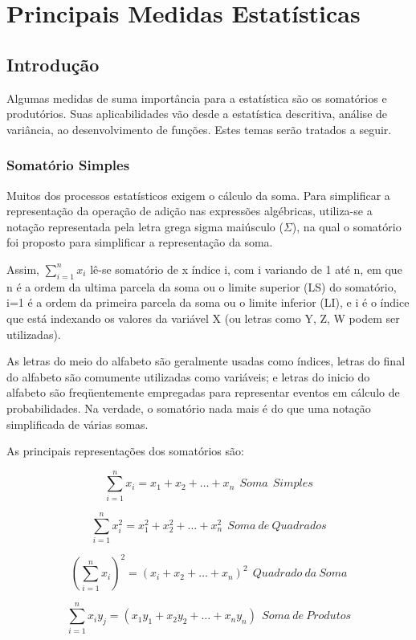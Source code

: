 \chapter{Principais Medidas Estatísticas}

\section{Introdução}

Algumas medidas de suma importância para a estatística são os somatórios e produtórios. Suas aplicabilidades vão desde a estatística descritiva, análise de variância, ao desenvolvimento de funções. Estes temas serão tratados a seguir.


\subsection{Somatório Simples}

\inic Muitos dos processos estatísticos exigem o cálculo da soma. Para simplificar a representação da operação de adição nas expressões algébricas, utiliza-se a notação representada pela letra grega sigma maiúsculo ($\Sigma$), na qual o somatório foi proposto para simplificar a representação da soma.\vskip0.3cm


Assim, $\sum_{i=1}^{n}x_{i}$  lê-se  somatório de x índice i, com i variando de 1 até n, em que n é a ordem da ultima parcela da soma ou o limite superior (LS) do somatório, i=1 é a ordem da primeira parcela da soma ou o limite inferior (LI), e i é o índice que está indexando os valores da variável  X (ou letras como Y, Z, W podem ser utilizadas).\vskip0.3cm

As letras do meio do alfabeto são geralmente usadas como índices, letras do final do alfabeto são comumente utilizadas como variáveis; e letras do inicio do alfabeto são freqüentemente empregadas para representar eventos em cálculo de probabilidades. Na verdade, o somatório nada mais é do que uma notação simplificada de várias somas.\vskip0.3cm

As principais representações dos somatórios são:


$$\sum_{i=1}^{n}x_{i}=x_{1}+x_{2}+\ldots+x_{n} \ \ Soma \ \ Simples$$

$$\sum_{i=1}^{n}x_{i}^{2}=x_{1}^{2}+x_{2}^{2}+\ldots+x_{n}^{2} \ \ Soma \ de \ Quadrados$$


$$ \left(\sum_{i=1}^{n}x_{i}\right)^{2}=(x_{i}+x_{2}+\ldots+x_{n})^{2} \ \ Quadrado \ da \ Soma$$

$$ \sum_{i=1}^{n}x_{i}y_{j}=(x_{1}y_{1}+x_{2}y_{2}+\ldots+x_{n}y_{n}) \ \ Soma \ de \ Produtos$$

